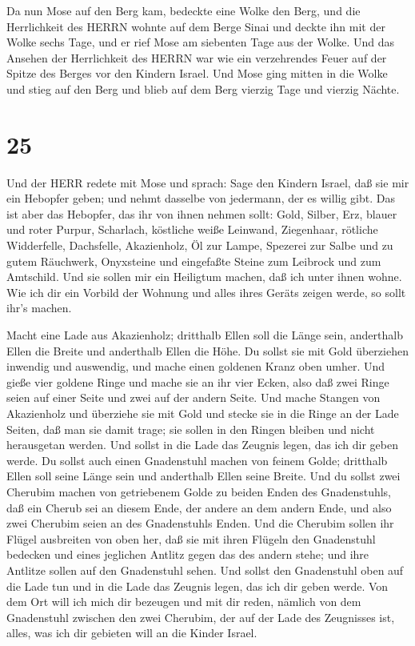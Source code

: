  Da nun Mose auf den Berg kam, bedeckte eine Wolke den
Berg,  und die Herrlichkeit des HERRN wohnte auf dem Berge
Sinai und deckte ihn mit der Wolke sechs Tage, und er rief Mose am
siebenten Tage aus der Wolke.  Und das Ansehen der
Herrlichkeit des HERRN war wie ein verzehrendes Feuer auf der Spitze des
Berges vor den Kindern Israel.  Und Mose ging mitten in die
Wolke und stieg auf den Berg und blieb auf dem Berg vierzig Tage und
vierzig Nächte.

\hypertarget{section-24}{%
\section{25}\label{section-24}}

 Und der HERR redete mit Mose und sprach:  Sage
den Kindern Israel, daß sie mir ein Hebopfer geben; und nehmt dasselbe
von jedermann, der es willig gibt.  Das ist aber das
Hebopfer, das ihr von ihnen nehmen sollt: Gold, Silber, Erz,
 blauer und roter Purpur, Scharlach, köstliche weiße
Leinwand, Ziegenhaar,  rötliche Widderfelle, Dachsfelle,
Akazienholz,  Öl zur Lampe, Spezerei zur Salbe und zu gutem
Räuchwerk,  Onyxsteine und eingefaßte Steine zum Leibrock
und zum Amtschild.  Und sie sollen mir ein Heiligtum machen,
daß ich unter ihnen wohne.  Wie ich dir ein Vorbild der
Wohnung und alles ihres Geräts zeigen werde, so sollt ihr's machen.

 Macht eine Lade aus Akazienholz; dritthalb Ellen soll die
Länge sein, anderthalb Ellen die Breite und anderthalb Ellen die Höhe.
 Du sollst sie mit Gold überziehen inwendig und auswendig,
und mache einen goldenen Kranz oben umher.  Und gieße vier
goldene Ringe und mache sie an ihr vier Ecken, also daß zwei Ringe seien
auf einer Seite und zwei auf der andern Seite.  Und mache
Stangen von Akazienholz und überziehe sie mit Gold  und
stecke sie in die Ringe an der Lade Seiten, daß man sie damit trage;
 sie sollen in den Ringen bleiben und nicht herausgetan
werden.  Und sollst in die Lade das Zeugnis legen, das ich
dir geben werde.  Du sollst auch einen Gnadenstuhl machen
von feinem Golde; dritthalb Ellen soll seine Länge sein und anderthalb
Ellen seine Breite.  Und du sollst zwei Cherubim machen von
getriebenem Golde zu beiden Enden des Gnadenstuhls,  daß
ein Cherub sei an diesem Ende, der andere an dem andern Ende, und also
zwei Cherubim seien an des Gnadenstuhls Enden.  Und die
Cherubim sollen ihr Flügel ausbreiten von oben her, daß sie mit ihren
Flügeln den Gnadenstuhl bedecken und eines jeglichen Antlitz gegen das
des andern stehe; und ihre Antlitze sollen auf den Gnadenstuhl sehen.
 Und sollst den Gnadenstuhl oben auf die Lade tun und in
die Lade das Zeugnis legen, das ich dir geben werde.  Von
dem Ort will ich mich dir bezeugen und mit dir reden, nämlich von dem
Gnadenstuhl zwischen den zwei Cherubim, der auf der Lade des Zeugnisses
ist, alles, was ich dir gebieten will an die Kinder Israel.

